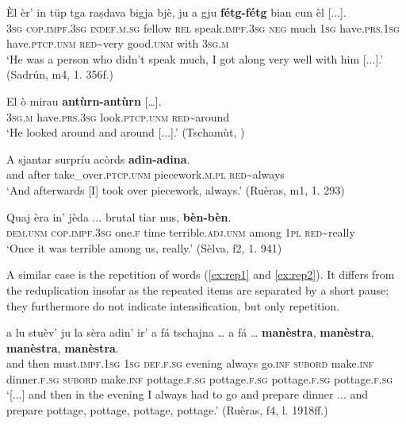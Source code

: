 \ea
\label{ex:redadv1}
\gll  Èl èr’ in tüp tga raṣdava bigja bjè, ju a gju \textbf{fétg-fétg} bian cun èl [...]. \\
\textsc{3sg} \textsc{cop.impf.3sg} \textsc{indef.m.sg} fellow \textsc{rel} speak.\textsc{impf.3sg} \textsc{neg} much \textsc{1sg} have.\textsc{prs.1sg} have.\textsc{ptcp.unm} \textsc{red}\textasciitilde{very} good.\textsc{unm} with \textsc{3sg.m}\\
\glt `He was a person who didn’t speak much, I got along very well with him [...].' (Sadrún, m4, 1. 356f.)
\z

\ea
\label{ex:redadv2}
\gll El ò mirau \textbf{antùrn-antùrn} […].\\
\textsc{3sg.m} have.\textsc{prs.3sg} look.\textsc{ptcp.unm} \textsc{red}\textasciitilde{around} \\
\glt `He looked around and around [...].' (Tschamùt, \citealt[18]{Büchli1966})
\z

\ea
\label{ex:redadv3}
\gll    A sjantar surpríu acòrds \textbf{adin-adina}.\\
and after take\_over.\textsc{ptcp.unm} piecework.\textsc{m.pl} \textsc{red}\textasciitilde{always} \\
\glt `And afterwards [I] took over piecework, always.' (Ruèras, m1, 1. 293)
\z

\ea
\label{ex:redadv4}
\gll Quaj èra in’ jèda ... brutal tiar nus, \textbf{bèn-bèn}.   \\
\textsc{dem.unm} \textsc{cop.impf.3sg} one.\textsc{f} time {} terrible.\textsc{adj.unm} among \textsc{1pl} \textsc{red}\textasciitilde{really}\\
\glt `Once it was terrible among us, really.' (Sèlva, f2, 1. 941)
\z

A similar case is the repetition of words (\ref{ex:rep1} and \ref{ex:rep2}). It differs from the reduplication insofar as the repeated items are separated by a short pause; they furthermore do not indicate intensification, but only repetition.

\ea
\label{ex:rep1}
\gll [...] a lu stuèv’ ju la sèra adin’ ir' a fá tschajna … a fá … \textbf{manèstra}, \textbf{manèstra}, \textbf{manèstra}, \textbf{manèstra}.\\
{} and then must.\textsc{impf.1sg} \textsc{1sg} \textsc{def.f.sg} evening always go.\textsc{inf} \textsc{subord} make.\textsc{inf} dinner.\textsc{f.sg} {} \textsc{subord} make.\textsc{inf} {}  pottage.\textsc{f.sg} pottage.\textsc{f.sg} pottage.\textsc{f.sg} pottage.\textsc{f.sg}\\
\glt `[...] and then in the evening I always had to go and prepare dinner ... and prepare pottage, pottage, pottage, pottage.' (Ruèras, f4, l. 1918ff.)
\z
 
